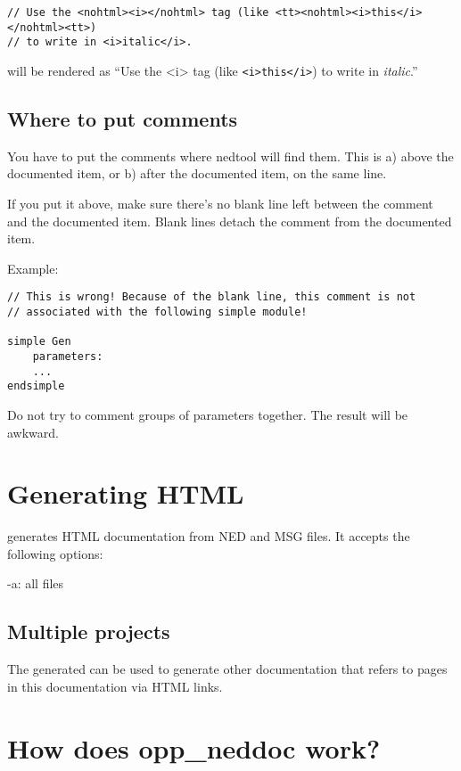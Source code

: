 \begin{verbatim}
// Use the <nohtml><i></nohtml> tag (like <tt><nohtml><i>this</i></nohtml><tt>)
// to write in <i>italic</i>.
\end{verbatim}

will be rendered as ``Use the <i> tag (like \texttt{<i>this</i>}) to write
in \textit{italic}.''



\subsection{Where to put comments}

You have to put the comments where nedtool will find them.
This is a) above the documented item, or b) after the
documented item, on the same line.

If you put it above, make sure there's no blank line left
between the comment and the documented item. Blank lines
detach the comment from the documented item.

Example:
\begin{verbatim}
// This is wrong! Because of the blank line, this comment is not
// associated with the following simple module!

simple Gen
    parameters:
    ...
endsimple
\end{verbatim}

Do not try to comment groups of parameters together. The result
will be awkward.


\section{Generating HTML}

 generates HTML documentation from NED and MSG files.
It accepts the following options:

-a: all files


\subsection{Multiple projects}

The generated  can be used to generate other documentation
that refers to pages in this documentation via HTML links.


\section{How does opp\_neddoc work?}

